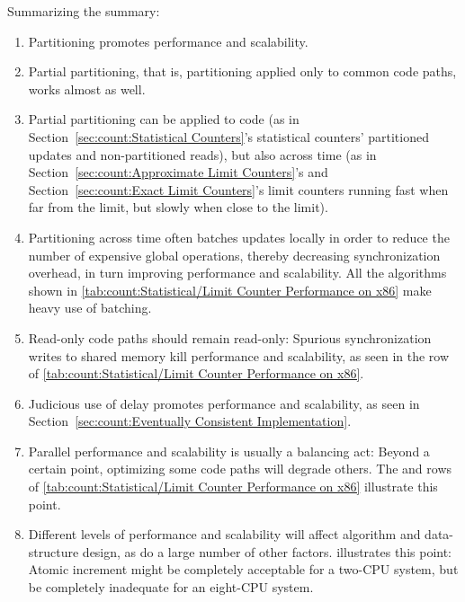 Summarizing the summary:

\begin{enumerate}
\item	Partitioning promotes performance and scalability.
\item	Partial partitioning, that is, partitioning applied only to
	common code paths, works almost as well.
\item	Partial partitioning can be applied to code (as in
	Section~\ref{sec:count:Statistical Counters}'s statistical
	counters' partitioned updates and non-partitioned reads), but also
	across time (as in
	Section~\ref{sec:count:Approximate Limit Counters}'s and
	Section~\ref{sec:count:Exact Limit Counters}'s
	limit counters running fast when far from
	the limit, but slowly when close to the limit).
\item	Partitioning across time often batches updates locally
	in order to reduce the number of expensive global operations,
	thereby decreasing synchronization overhead, in turn
	improving performance and scalability.
	All the algorithms shown in
	\cref{tab:count:Statistical/Limit Counter Performance on x86}
	make heavy use of batching.
\item	Read-only code paths should remain read-only:  Spurious
	synchronization writes to shared memory kill performance
	and scalability, as seen in the  row of
	\cref{tab:count:Statistical/Limit Counter Performance on x86}.
\item	Judicious use of delay promotes performance and scalability, as
	seen in Section~\ref{sec:count:Eventually Consistent Implementation}.
\item	Parallel performance and scalability is usually a balancing act:
	Beyond a certain point, optimizing some code paths will degrade
	others.
	The  and  rows of
	\cref{tab:count:Statistical/Limit Counter Performance on x86}
	illustrate this point.
\item	Different levels of performance and scalability will affect
	algorithm and data-structure design, as do a large number of
	other factors.
	illustrates this point:  Atomic increment might be completely
	acceptable for a two-CPU system, but be completely inadequate for an
	eight-CPU system.
\end{enumerate}

